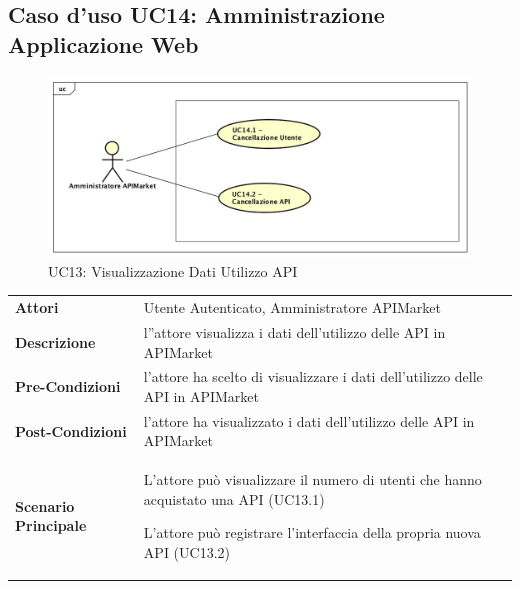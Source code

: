 \newpage
\subsection{Caso d'uso UC14: Amministrazione Applicazione Web}
\label{UC14}
\begin{figure}[ht]
	\centering
	\includegraphics[scale=0.45]{UML/UC14.png}
	\caption{UC13: Visualizzazione Dati Utilizzo API}
\end{figure}

\renewcommand*{\arraystretch}{1.6}
\begin{longtable}{ l | p{11cm}}
	\hline
	\rowcolor{Gray}
	\multicolumn{2}{c}{UC14: Amministrazione Applicazione Web} \\
	\hline
	\textbf{Attori} &Utente Autenticato, Amministratore APIMarket \\
	\textbf{Descrizione} &l''attore visualizza i dati dell'utilizzo delle API in APIMarket \\
	\textbf{Pre-Condizioni} &   l'attore ha scelto di visualizzare i dati dell'utilizzo delle API in APIMarket\\
	\textbf{Post-Condizioni}& l'attore ha visualizzato i dati dell'utilizzo delle API in APIMarket\\
	\textbf{Scenario Principale} & \begin{enumerate*}[label=(\arabic*.),itemjoin={\newline}]
		\item L'attore può visualizzare il numero di utenti che hanno acquistato una API (UC13.1)
		\item L'attore può registrare l'interfaccia della propria nuova API (UC13.2)
	\end{enumerate*}\\
\end{longtable}


